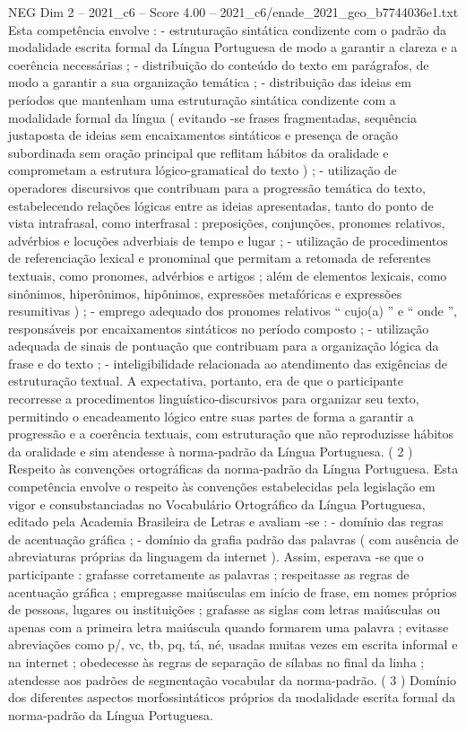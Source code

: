 \begin{textsample}{NEG Dim 2 – 2021\_c6 – Score 4.00 – 2021\_c6/enade\_2021\_geo\_b7744036e1.txt}
Esta competência envolve : - estruturação sintática condizente com o padrão da modalidade escrita formal da Língua Portuguesa de modo a garantir a clareza e a coerência necessárias ; - distribuição do conteúdo do texto em parágrafos, de modo a garantir a sua organização temática ; - distribuição das ideias em períodos que mantenham uma estruturação sintática condizente com a modalidade formal da língua ( evitando -se frases fragmentadas, sequência justaposta de ideias sem encaixamentos sintáticos e presença de oração subordinada sem oração principal que reflitam hábitos da oralidade e comprometam a estrutura lógico-gramatical do texto ) ; - utilização de operadores discursivos que contribuam para a progressão temática do texto, estabelecendo relações lógicas entre as ideias apresentadas, tanto do ponto de vista intrafrasal, como interfrasal : preposições, conjunções, pronomes relativos, advérbios e locuções adverbiais de tempo e lugar ; - utilização de procedimentos de referenciação lexical e pronominal que permitam a retomada de referentes textuais, como pronomes, advérbios e artigos ; além de elementos lexicais, como sinônimos, hiperônimos, hipônimos, expressões metafóricas e expressões resumitivas ) ; - emprego adequado dos pronomes relativos “ cujo(a) ” e “ onde ”, responsáveis por encaixamentos sintáticos no período composto ; - utilização adequada de sinais de pontuação que contribuam para a organização lógica da frase e do texto ; - inteligibilidade relacionada ao atendimento das exigências de estruturação textual.
A expectativa, portanto, era de que o participante recorresse a procedimentos linguístico-discursivos para organizar seu texto, permitindo o encadeamento lógico entre suas partes de forma a garantir a progressão e a coerência textuais, com estruturação que não reproduzisse hábitos da oralidade e sim atendesse à norma-padrão da Língua Portuguesa. ( 2 ) Respeito às convenções ortográficas da norma-padrão da Língua Portuguesa.
Esta competência envolve o respeito às convenções estabelecidas pela legislação em vigor e consubstanciadas no Vocabulário Ortográfico da Língua Portuguesa, editado pela Academia Brasileira de Letras e avaliam -se : - domínio das regras de acentuação gráfica ; - domínio da grafia padrão das palavras ( com ausência de abreviaturas próprias da linguagem da internet ).
Assim, esperava -se que o participante : grafasse corretamente as palavras ; respeitasse as regras de acentuação gráfica ; empregasse maiúsculas em início de frase, em nomes próprios de pessoas, lugares ou instituições ; grafasse as siglas com letras maiúsculas ou apenas com a primeira letra maiúscula quando formarem uma palavra ; evitasse abreviações como p/, vc, tb, pq, tá, né, usadas muitas vezes em escrita informal e na internet ; obedecesse às regras de separação de sílabas no final da linha ; atendesse aos padrões de segmentação vocabular da norma-padrão. ( 3 ) Domínio dos diferentes aspectos morfossintáticos próprios da modalidade escrita formal da norma-padrão da Língua Portuguesa.

\end{textsample}
